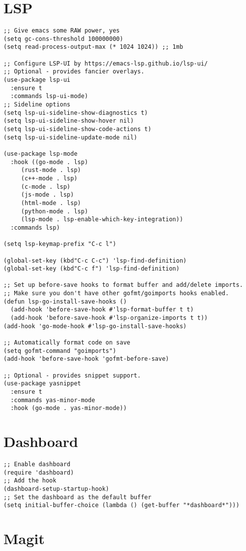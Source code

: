 \documentclass[11pt]{article}
\begin{document}
\section{LSP}
\label{sec:org591ba5c}
\begin{verbatim}
;; Give emacs some RAW power, yes
(setq gc-cons-threshold 100000000)
(setq read-process-output-max (* 1024 1024)) ;; 1mb

;; Configure LSP-UI by https://emacs-lsp.github.io/lsp-ui/
;; Optional - provides fancier overlays.
(use-package lsp-ui
  :ensure t
  :commands lsp-ui-mode)
;; Sideline options
(setq lsp-ui-sideline-show-diagnostics t)
(setq lsp-ui-sideline-show-hover nil)
(setq lsp-ui-sideline-show-code-actions t)
(setq lsp-ui-sideline-update-mode nil)

(use-package lsp-mode
  :hook ((go-mode . lsp)
	 (rust-mode . lsp)
	 (c++-mode . lsp)
	 (c-mode . lsp)
	 (js-mode . lsp)
	 (html-mode . lsp)
	 (python-mode . lsp)
	 (lsp-mode . lsp-enable-which-key-integration))
  :commands lsp)

(setq lsp-keymap-prefix "C-c l")

(global-set-key (kbd"C-c C-c") 'lsp-find-definition)
(global-set-key (kbd"C-c f") 'lsp-find-definition)

;; Set up before-save hooks to format buffer and add/delete imports.
;; Make sure you don't have other gofmt/goimports hooks enabled.
(defun lsp-go-install-save-hooks ()
  (add-hook 'before-save-hook #'lsp-format-buffer t t)
  (add-hook 'before-save-hook #'lsp-organize-imports t t))
(add-hook 'go-mode-hook #'lsp-go-install-save-hooks)

;; Automatically format code on save
(setq gofmt-command "goimports")
(add-hook 'before-save-hook 'gofmt-before-save)

;; Optional - provides snippet support.
(use-package yasnippet
  :ensure t
  :commands yas-minor-mode
  :hook (go-mode . yas-minor-mode))
\end{verbatim}
\section{Dashboard}
\label{sec:orgc44e190}
\begin{verbatim}
;; Enable dashboard
(require 'dashboard)
;; Add the hook
(dashboard-setup-startup-hook)
;; Set the dashboard as the default buffer
(setq initial-buffer-choice (lambda () (get-buffer "*dashboard*")))
\end{verbatim}
\section{Magit}
\label{sec:org5b25bbe}
\end{document}
